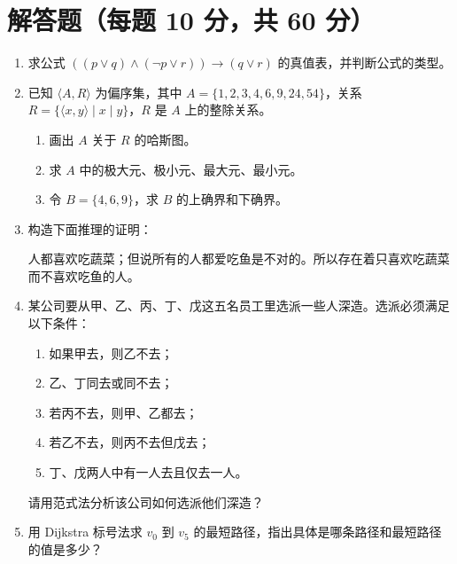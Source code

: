 \section{解答题（每题 10 分，共 60 分）}

\begin{enumerate}
    \item 求公式 $((p\lor q)\land(\neg p\lor r))\to(q\lor r)$ 的真值表，并判断公式的类型。

    \item 已知 $\langle A,R\rangle$ 为偏序集，其中
    $A=\{1,2,3,4,6,9,24,54\}$，关系
    $R=\{\langle x,y\rangle\mid x\mid y\}$，$R$ 是 $A$ 上的整除关系。
    \begin{enumerate}
        \item 画出 $A$ 关于 $R$ 的哈斯图。
        \item 求 $A$ 中的极大元、极小元、最大元、最小元。
        \item 令 $B=\{4,6,9\}$，求 $B$ 的上确界和下确界。
    \end{enumerate}

    \item 构造下面推理的证明：

    人都喜欢吃蔬菜；但说所有的人都爱吃鱼是不对的。所以存在着只喜欢吃蔬菜而不喜欢吃鱼的人。

    \item 某公司要从甲、乙、丙、丁、戊这五名员工里选派一些人深造。选派必须满足以下条件：
    \begin{enumerate}
        \item 如果甲去，则乙不去；
        \item 乙、丁同去或同不去；
        \item 若丙不去，则甲、乙都去；
        \item 若乙不去，则丙不去但戊去；
        \item 丁、戊两人中有一人去且仅去一人。
    \end{enumerate}
    请用范式法分析该公司如何选派他们深造？

    \item 用 Dijkstra 标号法求 $v_0$ 到 $v_5$ 的最短路径，指出具体是哪条路径和最短路径的值是多少？

    \begin{center}
\end{center}
\end{enumerate}
